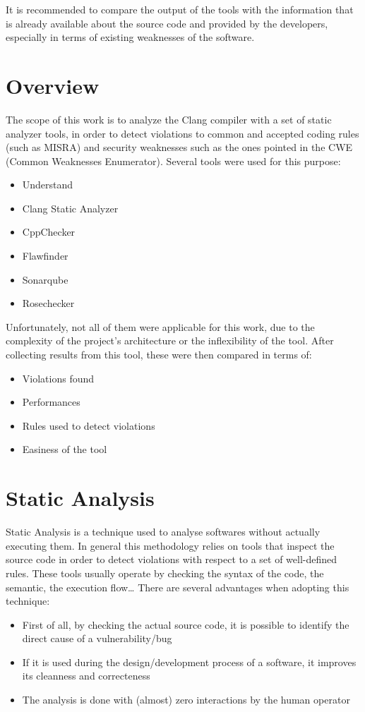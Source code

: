 It is recommended to compare the output of the tools with the information that is already available about
the source code and provided by the developers, especially in terms of existing weaknesses of the software.

\section{Overview}

The scope of this work is to analyze the Clang compiler with a set of static analyzer tools, in order to detect violations to common and accepted coding rules (such as MISRA) and security weaknesses such as the ones pointed in the CWE (Common Weaknesses Enumerator).\newline\newline
Several tools were used for this purpose:
\begin{itemize}
	\item Understand
	\item Clang Static Analyzer
	\item CppChecker
	\item Flawfinder
	\item Sonarqube
	\item Rosechecker
\end{itemize}
Unfortunately, not all of them were applicable for this work, due to the complexity of the project's architecture or the inflexibility of the tool.\newline
After collecting results from this tool, these were then compared in terms of:
\begin{itemize}
	\item Violations found
	\item Performances
	\item Rules used to detect violations
	\item Easiness of the tool
\end{itemize}
\section{Static Analysis}
Static Analysis is a technique used to analyse softwares without actually executing them.\newline
In general this methodology relies on tools that inspect the source code in order to detect violations with respect to a set of well-defined rules. These tools usually operate by checking the syntax of the code, the semantic, the execution flow\dots \newline\newline
There are several advantages when adopting this technique:
\begin{itemize}
	\item First of all, by checking the actual source code, it is possible to identify the direct cause of a vulnerability/bug
	\item If it is used during the design/development process of a software, it improves its cleanness and correcteness
	\item The analysis is done with (almost) zero interactions by the human operator
\end{itemize}

